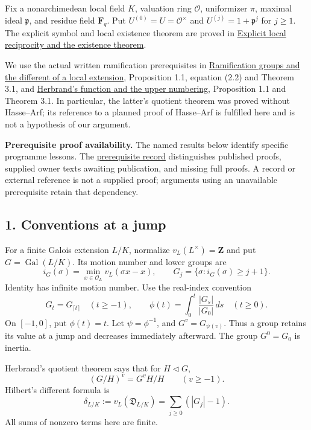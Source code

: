 \documentclass[11pt,a4paper]{article}
\begin{document}
Fix a nonarchimedean local field \(K\), valuation ring \(\mathcal O\),
uniformizer \(\pi\), maximal ideal \(\mathfrak p\), and residue field
\(\mathbf F_q\). Put \(U^{(0)}=U=\mathcal O^\times\) and
\(U^{(j)}=1+\mathfrak p^j\) for \(j\geq1\). The explicit symbol and
local existence theorem are proved in
\href{../explicit-local-reciprocity-and-existence.html}{Explicit local
reciprocity and the existence theorem}.

We use the actual written ramification prerequisites in
\href{https://kokunoyumeto.github.io/open-math-courses/courses/NT-CFT/proof-dependencies.html\#NT-LOC-09}{Ramification
groups and the different of a local extension}, Proposition 1.1,
equation (2.2) and Theorem 3.1, and
\href{https://kokunoyumeto.github.io/open-math-courses/courses/NT-CFT/proof-dependencies.html\#NT-LOC-10}{Herbrand's
function and the upper numbering}, Proposition 1.1 and Theorem 3.1. In
particular, the latter's quotient theorem was proved without Hasse--Arf;
its reference to a planned proof of Hasse--Arf is fulfilled here and is
not a hypothesis of our argument.

\textbf{Prerequisite proof availability.} The named results below
identify specific programme lessons. The
\href{https://kokunoyumeto.github.io/open-math-courses/courses/NT-CFT/proof-dependencies.html\#lesson-10}{prerequisite
record} distinguishes published proofs, supplied owner texts awaiting
publication, and missing full proofs. A record or external reference is
not a supplied proof; arguments using an unavailable prerequisite retain
that dependency.

\subsection{1. Conventions at a jump}\label{conventions-at-a-jump}

For a finite Galois extension \(L/K\), normalize
\(v_L(L^\times)=\mathbf Z\) and put \(G=\operatorname{Gal}(L/K)\). Its
motion number and lower groups are \[
i_G(\sigma)=\min_{x\in\mathcal O_L}v_L(\sigma x-x),\qquad
G_j=\{\sigma:i_G(\sigma)\geq j+1\}.
\] Identity has infinite motion number. Use the real-index convention \[
G_t=G_{\lceil t\rceil}\quad(t\geq-1),\qquad
\phi(t)=\int_0^t\frac{|G_s|}{|G_0|}\,ds\quad(t\geq0).
\tag{1}
\] On \([-1,0]\), put \(\phi(t)=t\). Let \(\psi=\phi^{-1}\), and
\(G^v=G_{\psi(v)}\). Thus a group retains its value at a jump and
decreases immediately afterward. The group \(G^0=G_0\) is inertia.

Herbrand's quotient theorem says that for \(H\triangleleft G\), \[
(G/H)^v=G^vH/H\qquad(v\geq-1).
\tag{2}
\] Hilbert's different formula is \[
\delta_{L/K}:=v_L(\mathfrak D_{L/K})
       =\sum_{j\geq0}(|G_j|-1).
\tag{3}
\] All sums of nonzero terms here are finite.
\end{document}
